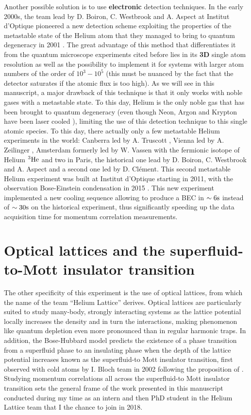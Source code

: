 Another possible solution is to use \textbf{electronic} detection techniques. In the early 2000s, the team lead by D. Boiron, C. Westbrook and A. Aspect at Institut d'Optique pioneered a new detection scheme exploiting the properties of the metastable state of the Helium atom that they managed to bring to quantum degeneracy in 2001 \cite{robert2001bose}. The great advantage of this method that differentiates it from the quantum microscope experiments cited before lies in its \textbf{3D} single atom resolution as well as the possibility to implement it for systems with larger atom numbers of the order of $10^3-10^5$ (this must be nuanced by the fact that the detector saturates if the atomic flux is too high). As we will see in this manuscript, a major drawback of this technique is that it only works with noble gases with a metastable state. To this day, Helium is the only noble gas that has been brought to quantum degeneracy (even though Neon, Argon and Krypton have been laser cooled \cite{shimizu1989laser,katori1990laser}), limiting the use of this detection technique to this single atomic species. To this day, there actually only a few metastable Helium experiments in the world: Canberra led by A. Truscott \cite{abbas2021rapid}, Vienna led by A. Zeilinger \cite{keller2014bose}, Amsterdam formerly led by W. Vassen \cite{mcnamara2006degenerate} with the fermionic isotope of Helium $^3 \rm{He}$ and two in Paris, the historical one lead by D. Boiron, C. Westbrook and A. Aspect and a second one led by D. Clément. This second metastable Helium experiment was built at Institut d'Optique starting in 2011, with the observation Bose-Einstein condensation in 2015 \cite{bouton2015fast}. This new experiment implemented a new cooling sequence allowing to produce a BEC in $\sim 6\rm{s}$ instead of $\sim 30\rm{s}$ on the historical experiment, thus significantly speeding up the data acquisition time for momentum correlation measurements.

\section*{Optical lattices and the superfluid-to-Mott insulator transition}

The other specificity of this experiment is the use of optical lattices, from which the name of the team ``Helium Lattice'' derives. Optical lattices are particularly suited to study many-body, strongly interacting systems as the lattice potential locally increases the density and in turn the interactions, making phenomenon like quantum depletion even more pronounced than in regular harmonic traps. In addition, the Bose-Hubbard model predicts the existence of a phase transition from a superfluid phase to an insulating phase when the depth of the lattice potential increases known as the superfluid-to Mott insulator transition, first observed with cold atoms by I. Bloch team in 2002 \cite{greiner2002quantum} following the proposition of \cite{jaksch1998cold}. Studying momentum correlations all across the superfluid-to Mott insulator transition sets the general frame of the work presented in this manuscript conducted during my time as an intern and then PhD student in the Helium Lattice team that I the chance to join in 2018.

